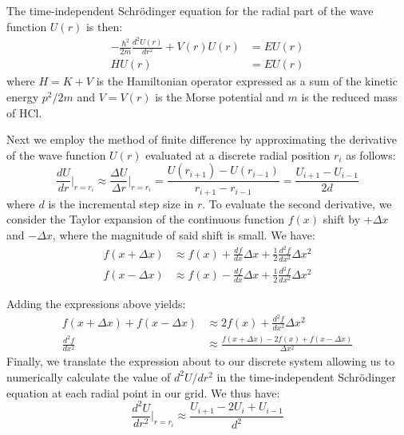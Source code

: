 \documentclass[%
aps, %
prl, %
preprint, %
12pt, %
amsfonts, %
amssymb, %
amsmath, %
endfloats,%
raggedbottom, %
]{revtex4-1}
\begin{document}
The time-independent Schrödinger equation for the radial part of the wave function $U(r)$
is then:
\begin{align}
    -\frac{\hbar^2}{2m}\frac{d^2U(r)}{dr^2} + V(r)U(r) &= EU(r) \label{TISE}\\
    HU(r) &= EU(r)
\end{align}
where $H = K + V$ is the Hamiltonian operator expressed as a sum of the kinetic energy $p^2/2m$
and $V = V(r)$ is the Morse potential and $m$ is the reduced mass of HCl.

Next we employ the method of finite difference by approximating the derivative of the wave
function $U(r)$ evaluated at a discrete radial position $r_i$ as follows:
\begin{equation}
    \frac{dU}{dr}\Bigr|_{r=r_i} \approx \frac{\Delta U}{\Delta r}\Bigr|_{r=r_i} = \frac{U(r_{i+1}) - U(r_{i-1})}{r_{i+1} - r_{i-1}} = \frac{U_{i+1} - U_{i-1}}{2d}
\end{equation}
where $d$ is the incremental step size in $r$. To evaluate the second derivative, we consider
the Taylor expansion of the continuous function $f(x)$ shift by $+\Delta x$ and $-\Delta x$,
where the magnitude of said shift is small. We have:
\begin{align}
    f(x + \Delta x) & \approx f(x) + \frac{df}{dx}\Delta x + \frac{1}{2}\frac{d^2f}{dx^2}\Delta x^2 \\
    f(x - \Delta x) & \approx f(x) - \frac{df}{dx}\Delta x + \frac{1}{2}\frac{d^2f}{dx^2}\Delta x^2
\end{align}

Adding the expressions above yields:
\begin{align}
    f(x + \Delta x) + f(x - \Delta x) & \approx 2f(x) + \frac{d^2f}{dx^2}\Delta x^2 \\
    \frac{d^2f}{dx^2} & \approx \frac{f(x + \Delta x) - 2f(x) + f(x - \Delta x)}{\Delta x^2}
\end{align}
Finally, we translate the expression about to our discrete system allowing us to numerically
calculate the value of $d^2U/dr^2$ in the time-independent Schrödinger equation at each radial
point in our grid. We thus have:
\begin{equation} \label{finite-diff}
    \frac{d^2U}{dr^2}\Bigr|_{r=r_i} \approx \frac{U_{i+1} - 2U_i + U_{i-1}}{d^2}
\end{equation}
\end{document}
